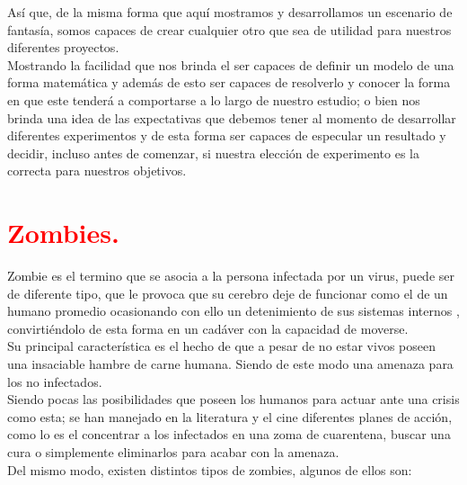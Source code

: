 \documentclass[12pt]{article}
\begin{document}
 Así que, de la misma forma que aquí mostramos y desarrollamos un escenario de fantasía, somos capaces de crear cualquier otro que sea de utilidad para nuestros diferentes proyectos.\\
 
 Mostrando la facilidad que nos brinda el ser capaces de definir un modelo de una forma matemática y además de esto ser capaces de resolverlo y conocer la forma en que este tenderá a comportarse a lo largo de nuestro estudio; o bien nos brinda una idea de las expectativas que debemos tener al momento de desarrollar diferentes experimentos y de esta forma ser capaces de especular un resultado y decidir, incluso antes de comenzar, si nuestra elección de experimento es la correcta para nuestros objetivos.
 
 
 
 
\section*{\textcolor{Red}{Zombies.}}

Zombie es el termino que se asocia a la persona infectada por un virus, puede ser de diferente tipo, que le provoca que su cerebro deje de funcionar como el de un humano promedio ocasionando con ello un detenimiento de sus sistemas internos , convirtiéndolo de esta forma en un cadáver con la capacidad de moverse.\\ 

Su principal característica es el hecho de que a pesar de no estar vivos poseen una insaciable hambre de carne humana. Siendo de este modo una amenaza para los no infectados.\\

Siendo pocas las posibilidades que poseen los humanos para actuar ante una crisis como esta; se han manejado en la literatura y el cine diferentes planes de acción, como lo es el concentrar a los infectados en una zoma de cuarentena, buscar una cura o simplemente eliminarlos para acabar con la amenaza.\\

Del mismo modo, existen distintos tipos de zombies, algunos de ellos son:
\end{document}
